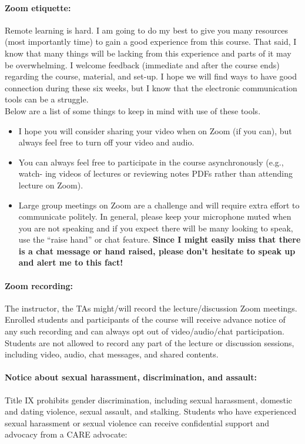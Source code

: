 \documentclass[11pt,letter]{article}
\begin{document}
\paragraph{Zoom etiquette:} 
Remote learning is hard. I am going to do my best
to give you many resources (most importantly time) to gain a good experience from this
course. That said, I know that many things will be lacking from this experience and
parts of it may be overwhelming. I welcome feedback (immediate and after the course
ends) regarding the course, material, and set-up. I hope we will find ways to have good
connection during these six weeks, but I know that the electronic communication tools
can be a struggle. \\

Below are a list of some things to keep in mind with use of these
tools.
\begin{itemize}
\item I hope you will consider sharing your video when on Zoom (if you can), but always
feel free to turn off your video and audio.
\item You can always feel free to participate in the course asynchronously (e.g., watch-
ing videos of lectures or reviewing notes PDFs rather than attending lecture on
Zoom).
\item Large group meetings on Zoom are a challenge and will require extra effort to
communicate politely. In general, please keep your microphone muted when you
are not speaking and if you expect there will be many looking to speak, use the
``raise hand'' or chat feature. \textbf{Since I might easily miss that there is a chat message
or hand raised, please don't hesitate to speak up and alert me to this fact!}
\end{itemize}

\paragraph{Zoom recording: } The instructor, the TAs might/will record the lecture/discussion
Zoom meetings. Enrolled students and participants of the course will receive advance
notice of any such recording and can always opt out of video/audio/chat participation.
Students are not allowed to record any part of the lecture or discussion sessions, including video, audio, chat messages, and shared contents.


\paragraph{Notice about sexual harassment, discrimination, and assault: }
Title IX prohibits gender discrimination, including sexual harassment, domestic and dating violence, sexual assault, and stalking. Students who have experienced sexual harassment
or sexual violence can receive confidential support and advocacy from a CARE advocate:\\
\end{document}
